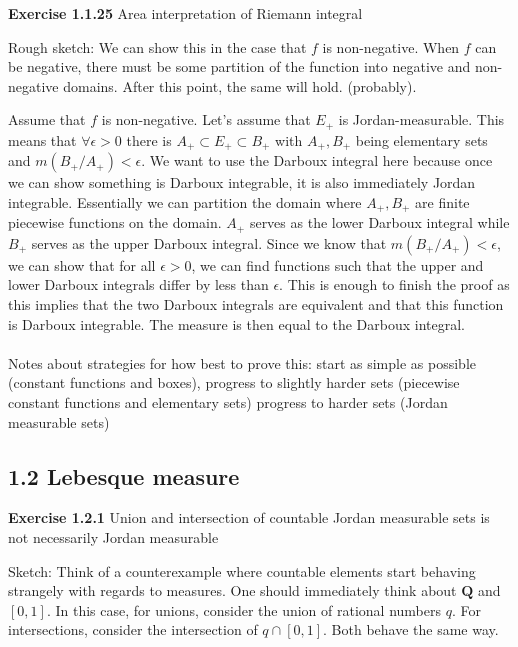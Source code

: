 \documentclass[answers,12pt]{exam}
\begin{document}
\textbf{Exercise 1.1.25} Area interpretation of Riemann integral
\begin{solution}
    Rough sketch:
    We can show this in the case that $f$ is non-negative.
    When $f$ can be negative, there must be some partition of the function into negative and non-negative domains.
    After this point, the same will hold. (probably).

    Assume that $f$ is non-negative.
    Let's assume that $E_+$ is Jordan-measurable.
    This means that $\forall \epsilon >0$ there is $A_+ \subset E_+ \subset B_+$ with $A_+, B_+$ being elementary sets and $m(B_+/A_+) < \epsilon$.
    We want to use the Darboux integral here because once we can show something is Darboux integrable, it is also immediately Jordan integrable.
    Essentially we can partition the domain where $A_+, B_+$ are finite piecewise functions on the domain.
    $A_+$ serves as the lower Darboux integral while $B_+$ serves as the upper Darboux integral.
    Since we know that $m(B_+/A_+) < \epsilon$, we can show that for all $\epsilon > 0$, we can find functions such that the upper and lower Darboux integrals differ by less than $\epsilon$.
    This is enough to finish the proof as this implies that the two Darboux integrals are equivalent and that this function is Darboux integrable.
    The measure is then equal to the Darboux integral. \\ \\

    Notes about strategies for how best to prove this:
    start as simple as possible (constant functions and boxes),
    progress to slightly harder sets (piecewise constant functions and elementary sets)
    progress to harder sets (Jordan measurable sets)
\end{solution}


\subsection{1.2 Lebesque measure}

\textbf{Exercise 1.2.1} Union and intersection of countable Jordan measurable sets is not necessarily Jordan measurable
\begin{solution}
    Sketch: Think of a counterexample where countable elements start behaving strangely with regards to measures.
    One should immediately think about $\mathbf{Q}$ and $[0,1]$.
    In this case, for unions, consider the union of rational numbers $q$.
    For intersections, consider the intersection of $q \cap [0,1]$.
    Both behave the same way.
\end{solution}
\end{document}
